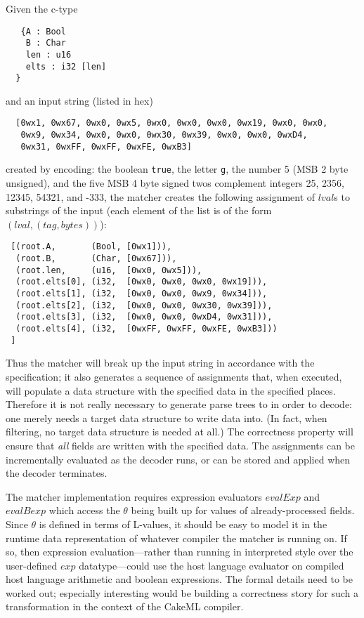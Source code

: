 \documentclass[svgnames]{llncs}
\begin{document}
\begin{example}
Given the c-type
\begin{verbatim}
   {A : Bool
    B : Char
    len : u16
    elts : i32 [len]
  }
\end{verbatim}
\noindent and an input string (listed in hex)
\begin{verbatim}
  [0wx1, 0wx67, 0wx0, 0wx5, 0wx0, 0wx0, 0wx0, 0wx19, 0wx0, 0wx0,
   0wx9, 0wx34, 0wx0, 0wx0, 0wx30, 0wx39, 0wx0, 0wx0, 0wxD4,
   0wx31, 0wxFF, 0wxFF, 0wxFE, 0wxB3]
\end{verbatim}
created by encoding: the boolean \verb+true+, the letter \verb+g+, the
number 5 (MSB 2 byte unsigned), and the five MSB 4 byte signed twos complement
integers 25, 2356, 12345, 54321, and -333, the matcher creates the
following assignment of $\mathit{lval}$s to substrings of the input
(each element of the list is of the form
$(\mathit{lval}, (\mathit{tag},\mathit{bytes}))$):

\begin{verbatim}
 [(root.A,       (Bool, [0wx1])),
  (root.B,       (Char, [0wx67])),
  (root.len,     (u16,  [0wx0, 0wx5])),
  (root.elts[0], (i32,  [0wx0, 0wx0, 0wx0, 0wx19])),
  (root.elts[1], (i32,  [0wx0, 0wx0, 0wx9, 0wx34])),
  (root.elts[2], (i32,  [0wx0, 0wx0, 0wx30, 0wx39])),
  (root.elts[3], (i32,  [0wx0, 0wx0, 0wxD4, 0wx31])),
  (root.elts[4], (i32,  [0wxFF, 0wxFF, 0wxFE, 0wxB3]))
 ]
\end{verbatim}

\end{example}

Thus the matcher will break up the input string in accordance with the
specification; it also generates a sequence of assignments that, when
executed, will populate a data structure with the specified data in
the specified places. Therefore it is not really necessary to generate
parse trees to in order to decode: one merely needs a target data
structure to write data into. (In fact, when filtering, no target data
structure is needed at all.) The correctness property will ensure that
\emph{all} fields are written with the specified data. The assignments
can be incrementally evaluated as the decoder runs, or can be stored
and applied when the decoder terminates.

\begin{remark}
  The matcher implementation requires expression evaluators
  $\mathit{evalExp}$ and $\mathit{evalBexp}$ which access the $\theta$
  being built up for values of already-processed fields. Since
  $\theta$ is defined in terms of L-values, it should be easy to model
  it in the runtime data representation of whatever compiler the
  matcher is running on. If so, then expression evaluation---rather
  than running in interpreted style over the user-defined
  $\mathit{exp}$ datatype---could use the host language evaluator on
  compiled host language arithmetic and boolean expressions. The
  formal details need to be worked out; especially interesting would
  be building a correctness story for such a transformation in the
  context of the CakeML compiler.
\end{remark}
\end{document}
